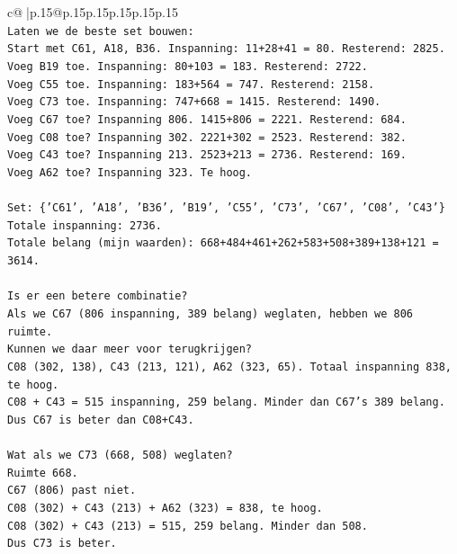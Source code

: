 \documentclass{article}
\begin{document}
{\begin{supertabular}{c@{$\;$}|p{.15\linewidth}@{}p{.15\linewidth}p{.15\linewidth}p{.15\linewidth}p{.15\linewidth}p{.15\linewidth}}
{{{\\ 
\texttt{Laten we de beste set bouwen:} \\
\texttt{Start met C61, A18, B36. Inspanning: 11+28+41 = 80. Resterend: 2825.} \\
\texttt{Voeg B19 toe. Inspanning: 80+103 = 183. Resterend: 2722.} \\
\texttt{Voeg C55 toe. Inspanning: 183+564 = 747. Resterend: 2158.} \\
\texttt{Voeg C73 toe. Inspanning: 747+668 = 1415. Resterend: 1490.} \\
\texttt{Voeg C67 toe? Inspanning 806. 1415+806 = 2221. Resterend: 684.} \\
\texttt{Voeg C08 toe? Inspanning 302. 2221+302 = 2523. Resterend: 382.} \\
\texttt{Voeg C43 toe? Inspanning 213. 2523+213 = 2736. Resterend: 169.} \\
\texttt{Voeg A62 toe? Inspanning 323. Te hoog.} \\
\\ 
\texttt{Set: \{'C61', 'A18', 'B36', 'B19', 'C55', 'C73', 'C67', 'C08', 'C43'\}} \\
\texttt{Totale inspanning: 2736.} \\
\texttt{Totale belang (mijn waarden): 668+484+461+262+583+508+389+138+121 = 3614.} \\
\\ 
\texttt{Is er een betere combinatie?} \\
\texttt{Als we C67 (806 inspanning, 389 belang) weglaten, hebben we 806 ruimte.} \\
\texttt{Kunnen we daar meer voor terugkrijgen?} \\
\texttt{C08 (302, 138), C43 (213, 121), A62 (323, 65). Totaal inspanning 838, te hoog.} \\
\texttt{C08 + C43 = 515 inspanning, 259 belang. Minder dan C67's 389 belang.} \\
\texttt{Dus C67 is beter dan C08+C43.} \\
\\ 
\texttt{Wat als we C73 (668, 508) weglaten?} \\
\texttt{Ruimte 668.} \\
\texttt{C67 (806) past niet.} \\
\texttt{C08 (302) + C43 (213) + A62 (323) = 838, te hoog.} \\
\texttt{C08 (302) + C43 (213) = 515, 259 belang. Minder dan 508.} \\
\texttt{Dus C73 is beter.} \\
}}}
\end{supertabular}}
\end{document}
